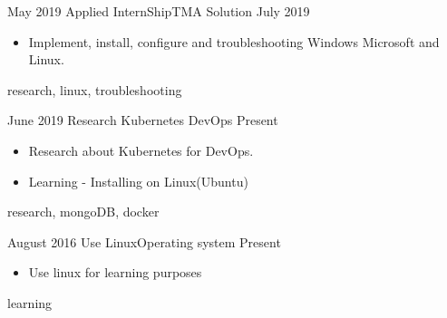 

\begin{experiences}
	
	\experience%
	{May 2019}
	{Applied InternShip}{TMA Solution}{}
	{July 2019}
	{
		\begin{itemize}
			\item Implement, install, configure and troubleshooting Windows Microsoft and Linux.
		\end{itemize}
	}
	{research, linux, troubleshooting }
	\emptySeparator%
	
	\experience%
	{June 2019 }
	{ Research Kubernetes DevOps}{}{ }
	{Present}
	{
		\begin{itemize}
			\item Research about Kubernetes for DevOps.
			\item Learning - Installing on Linux(Ubuntu)
		\end{itemize}
	}
	{research, mongoDB, docker}
	\emptySeparator%
	
	\experience%
	{August 2016}
	{Use Linux}{Operating system}{ }
	{Present}
	{
		\begin{itemize}
			\item Use linux for learning purposes
		\end{itemize}
	}
	{learning}

\end{experiences}
